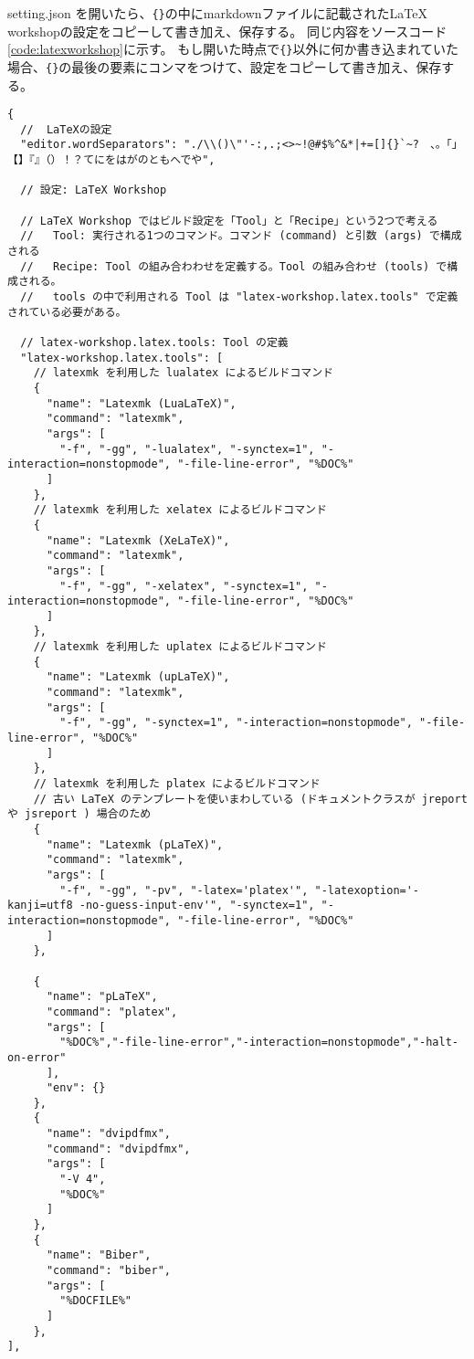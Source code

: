 \documentclass[titlepage]{ltjsarticle}
\begin{document}
setting.json を開いたら、\verb|{}|の中にmarkdownファイルに記載されたLaTeX workshopの設定をコピーして書き加え、保存する。
同じ内容をソースコード\ref{code:latexworkshop}に示す。
もし開いた時点で\verb|{}|以外に何か書き込まれていた場合、\verb|{}|の最後の要素にコンマをつけて、設定をコピーして書き加え、保存する。
\begin{lstlisting}[caption={LaTeX workshopの設定},label=code:latexworkshop]
  {
  //  LaTeXの設定
  "editor.wordSeparators": "./\\()\"'-:,.;<>~!@#$%^&*|+=[]{}`~?　、。「」【】『』（）！？てにをはがのともへでや",

  // 設定: LaTeX Workshop

  // LaTeX Workshop ではビルド設定を「Tool」と「Recipe」という2つで考える
  //   Tool: 実行される1つのコマンド。コマンド (command) と引数 (args) で構成される
  //   Recipe: Tool の組み合わわせを定義する。Tool の組み合わせ (tools) で構成される。
  //   tools の中で利用される Tool は "latex-workshop.latex.tools" で定義されている必要がある。
  
  // latex-workshop.latex.tools: Tool の定義
  "latex-workshop.latex.tools": [
    // latexmk を利用した lualatex によるビルドコマンド
    {
      "name": "Latexmk (LuaLaTeX)",
      "command": "latexmk",
      "args": [
        "-f", "-gg", "-lualatex", "-synctex=1", "-interaction=nonstopmode", "-file-line-error", "%DOC%"
      ]
    },
    // latexmk を利用した xelatex によるビルドコマンド
    {
      "name": "Latexmk (XeLaTeX)",
      "command": "latexmk",
      "args": [
        "-f", "-gg", "-xelatex", "-synctex=1", "-interaction=nonstopmode", "-file-line-error", "%DOC%"
      ]
    },
    // latexmk を利用した uplatex によるビルドコマンド
    {
      "name": "Latexmk (upLaTeX)",
      "command": "latexmk",
      "args": [
        "-f", "-gg", "-synctex=1", "-interaction=nonstopmode", "-file-line-error", "%DOC%"
      ]
    },
    // latexmk を利用した platex によるビルドコマンド
    // 古い LaTeX のテンプレートを使いまわしている (ドキュメントクラスが jreport や jsreport ) 場合のため
    {
      "name": "Latexmk (pLaTeX)",
      "command": "latexmk",
      "args": [
        "-f", "-gg", "-pv", "-latex='platex'", "-latexoption='-kanji=utf8 -no-guess-input-env'", "-synctex=1", "-interaction=nonstopmode", "-file-line-error", "%DOC%"
      ]
    },

    {
      "name": "pLaTeX",
      "command": "platex",
      "args": [
        "%DOC%","-file-line-error","-interaction=nonstopmode","-halt-on-error"
      ],
      "env": {}
    },
    {
      "name": "dvipdfmx",
      "command": "dvipdfmx",
      "args": [
        "-V 4",
        "%DOC%"
      ]
    },
    {
      "name": "Biber",
      "command": "biber",
      "args": [
        "%DOCFILE%"
      ]
    },
],


\end{lstlisting}
\end{document}
